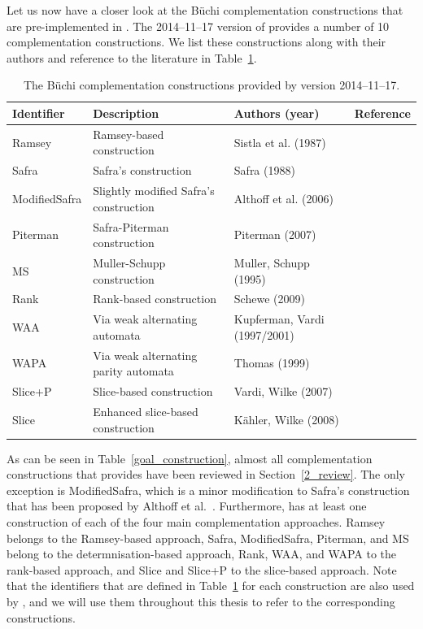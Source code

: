 Let us now have a closer look at the Büchi complementation constructions that are pre-implemented in \goal. The 2014--11--17 version of \goal{} provides a number of 10 complementation constructions. We list these constructions along with their authors and reference to the literature in Table~\ref{goal_constructions}.

\begin{table}[htb!]
\centering
\begin{tabular}{lllr}
\hline
Identifier & Description & Authors (year) & Reference \\
\hline
Ramsey        & Ramsey-based construction & Sistla et al. (1987)
              & \cite{1985_sistla,PrasadSistla1987217} \\
Safra         & Safra's construction & Safra (1988)
              & \cite{1988_safra_2,1988_safra_1} \\
ModifiedSafra & Slightly modified Safra's construction & Althoff et al. (2006)
              & \cite{2006_althoff} \\
Piterman      & Safra-Piterman construction & Piterman (2007)
              & \cite{2006_piterman,2007_piterman} \\
MS            & Muller-Schupp construction & Muller, Schupp (1995)
              & \cite{Muller199569} \\
Rank          & Rank-based construction & Schewe (2009)
              & \cite{schewe2009buchi} \\
WAA           & Via weak alternating automata & Kupferman, Vardi (1997/2001)
              & \cite{1997_vardi,Kupferman:2001} \\
WAPA          & Via weak alternating parity automata & Thomas (1999)
              & \cite{1999_thomas} \\
Slice+P       & Slice-based construction & Vardi, Wilke (2007)
              & \cite{vardi2007automata} \\
Slice         & Enhanced slice-based construction & Kähler, Wilke (2008)
              & \cite{2008_kaehler} \\
\hline
\end{tabular}
\caption{The Büchi complementation constructions provided by \goal{} version 2014--11--17.}
\label{goal_constructions}
\end{table}

As can be seen in Table~\ref{goal_construction}, almost all complementation constructions that \goal{} provides have been reviewed in Section~\ref{2_review}. The only exception is ModifiedSafra, which is a minor modification to Safra's construction that has been proposed by Althoff et al.~\cite{2006_althoff}. Furthermore, \goal{} has at least one construction of each of the four main complementation approaches. Ramsey belongs to the Ramsey-based approach, Safra, ModifiedSafra, Piterman, and MS belong to the determnisation-based approach, Rank, WAA, and WAPA to the rank-based approach, and Slice and Slice+P to the slice-based approach. Note that the identifiers that are defined in Table~\ref{goal_constructions} for each construction are also used by \goal, and we will use them throughout this thesis to refer to the corresponding constructions.


